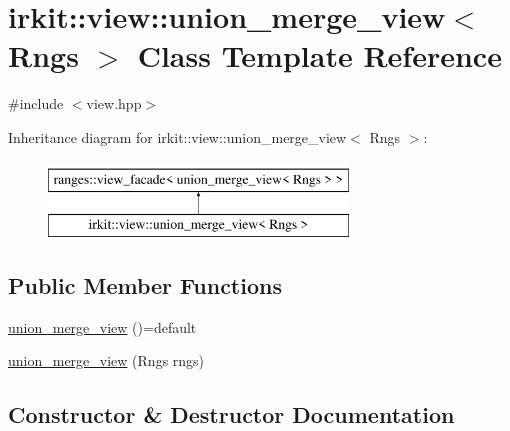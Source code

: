 \hypertarget{classirkit_1_1view_1_1union__merge__view}{}\section{irkit\+:\+:view\+:\+:union\+\_\+merge\+\_\+view$<$ Rngs $>$ Class Template Reference}
\label{classirkit_1_1view_1_1union__merge__view}


{\ttfamily \#include $<$view.\+hpp$>$}

Inheritance diagram for irkit\+:\+:view\+:\+:union\+\_\+merge\+\_\+view$<$ Rngs $>$\+:\begin{figure}[H]
\begin{center}
\leavevmode
\includegraphics[height=2.000000cm]{classirkit_1_1view_1_1union__merge__view}
\end{center}
\end{figure}
\subsection*{Public Member Functions}
\begin{DoxyCompactItemize}
\item 
\hyperlink{classirkit_1_1view_1_1union__merge__view_a4a0c577e38ae0f12f3c8638911ff0e30}{union\+\_\+merge\+\_\+view} ()=default
\item 
\hyperlink{classirkit_1_1view_1_1union__merge__view_af2e80cdce25cdfd8db01a868a4dbf964}{union\+\_\+merge\+\_\+view} (Rngs rngs)
\end{DoxyCompactItemize}


\subsection{Constructor \& Destructor Documentation}
\mbox{\label{classirkit_1_1view_1_1union__merge__view_a4a0c577e38ae0f12f3c8638911ff0e30}} 
